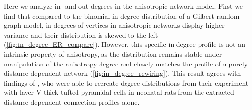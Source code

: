 Here we analyze in- and out-degrees in the anisotropic network
model. First we find that compared to the binomial in-degree
distribution of a Gilbert random graph model, in-degrees of vertices
in anisotropic networks display higher variance and their distribution
is skewed to the left (\autoref{fig:in_degree_ER_compare}). However,
this specific in-degree profile is not an intrinsic property of
anisotropy, as the distribution remains stable under manipulation of
the anisotropy degree and closely matches the profile of a purely
distance-dependent network (\autoref{fig:in_degree_rewiring}). This
result agrees with findings of \textcite[Fig. S3]{Perin2011}, who were
able to recreate degree distributions from their experiment with layer
V thick-tufted pyramidal cells in neonatal rats from the extracted
distance-dependent connection profiles alone.



